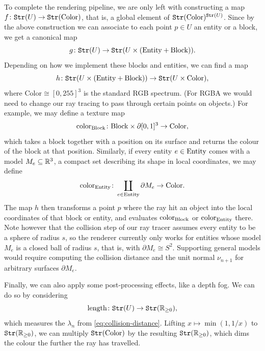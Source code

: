 To complete the rendering pipeline, we are only left with constructing a map
$f \colon \texttt{Str}(U) \to \texttt{Str}(\mathrm{Color})$, that is, a global element of
$\texttt{Str}(\mathrm{Color})^{\texttt{Str}(U)}$. Since by the above construction we can
associate to each point $p \in U$ an entity or a block, we get a canonical
map
\[
	g \colon \texttt{Str}(U) \to \texttt{Str}(U \times (\mathrm{Entity} + \mathrm{Block})).
\]
Depending on how we implement these blocks and entities, we can find a map
\[
	h \colon \texttt{Str}(U \times (\mathrm{Entity} + \mathrm{Block})) \to \texttt{Str}(U \times \mathrm{Color}),
\]
where $\mathrm{Color} \cong [0,255]^3$ is the standard RGB spectrum. (For RGBA
we would need to change our ray tracing to pass through certain points on
objects.) For example, we may define a texture map
\[
	\mathrm{color}_{\mathrm{Block}} \colon \mathrm{Block} \times \partial [0,1]^3 \to \mathrm{Color},
\]
which takes a block together with a position on its surface and returns the
colour of the block at that position. Similarly, if every entity
$e \in \mathrm{Entity}$ comes with a model $M_e \subseteq \mathbb{R}^3$, a compact set
describing its shape in local coordinates, we may define
\[
	\mathrm{color}_{\mathrm{Entity}} \colon \coprod_{e \in \mathrm{Entity}} \partial M_e \to \mathrm{Color}.
\]
The map $h$ then transforms a point $p$ where the ray hit an object into the
local coordinates of that block or entity, and evaluates
$\mathrm{color}_{\mathrm{Block}}$ or $\mathrm{color}_{\mathrm{Entity}}$ there. Note however
that the collision step of our ray tracer assumes every entity to be a sphere
of radius $s$, so the renderer currently only works for entities whose model
$M_e$ is a closed ball of radius $s$, that is, with $\partial M_e \cong S^2$.
Supporting general models would require computing the collision distance and
the unit normal $\nu_{n+1}$ for arbitrary surfaces $\partial M_e$.

Finally, we can also apply some post-processing effects, like a depth fog. We
can do so by considering
\[
	\mathrm{length} \colon \texttt{Str}(U) \to \texttt{Str}(\mathbb{R}_{\ge 0}),
\]
which measures the $\lambda_n$ from \eqref{eq:collision-distance}. Lifting
$x \mapsto \min(1, 1/x)$ to $\texttt{Str}(\mathbb{R}_{\ge 0})$, we can multiply
$\texttt{Str}(\mathrm{Color})$ by the resulting $\texttt{Str}(\mathbb{R}_{\ge 0})$, which dims
the colour the further the ray has travelled.


